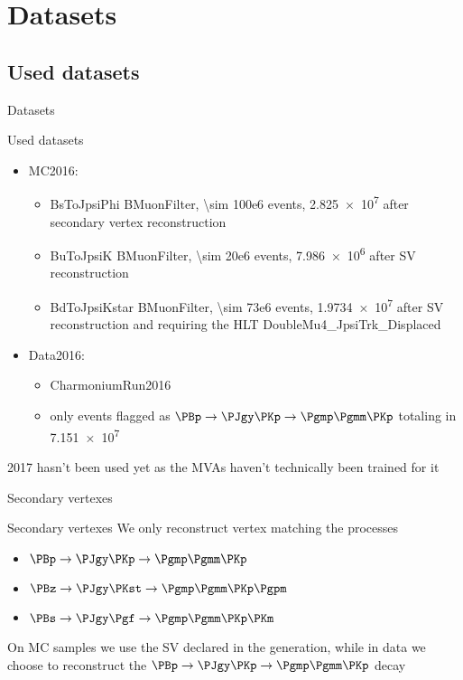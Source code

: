 \section{Datasets}

\subsection{Used datasets}
\begin{frame}{Datasets}
	\begin{block}{Used datasets}
		\begin{itemize}
			\item MC2016:
				\begin{itemize}
					\item BsToJpsiPhi BMuonFilter, \num{\sim 100e6} events, \num{2.825e7} after secondary vertex reconstruction
					\item BuToJpsiK BMuonFilter, \num{\sim 20e6} events, \num{7.986e6} after SV reconstruction
					\item BdToJpsiKstar BMuonFilter, \num{\sim 73e6} events, \num{1.9734e7} after SV reconstruction and requiring the HLT DoubleMu4\_JpsiTrk\_Displaced
				\end{itemize}
			\item Data2016:
				\begin{itemize}
					\item CharmoniumRun2016
					\item only events flagged as $\PBp\to\PJgy\PKp\to\Pgmp\Pgmm\PKp$ totaling in \num{7.151e7}
				\end{itemize}
		\end{itemize}
		2017 hasn't been used yet as the MVAs haven't technically been trained for it
	\end{block}
\end{frame}

\begin{frame}{Secondary vertexes}
	\begin{block}{Secondary vertexes}
		We only reconstruct vertex matching the processes
		\begin{itemize}
			\item $\PBp\to\PJgy\PKp\to\Pgmp\Pgmm\PKp$
			\item $\PBz\to\PJgy\PKst\to\Pgmp\Pgmm\PKp\Pgpm$
			\item $\PBs\to\PJgy\Pgf\to\Pgmp\Pgmm\PKp\PKm$
		\end{itemize}
	\end{block}
	\begin{block}{}
		On MC samples we use the SV declared in the generation, while in data we choose to reconstruct the $\PBp\to\PJgy\PKp\to\Pgmp\Pgmm\PKp$ decay
	\end{block}
\end{frame}


